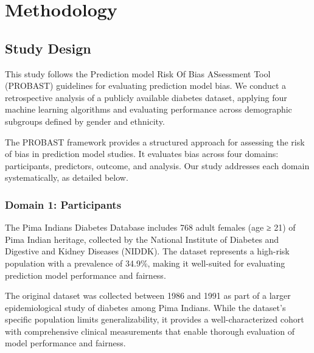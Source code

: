
\section{Methodology}

\subsection{Study Design}

This study follows the Prediction model Risk Of Bias ASsessment Tool 
(PROBAST) guidelines \cite{wolff2019} for evaluating prediction model 
bias. We conduct a retrospective analysis of a publicly available diabetes 
dataset, applying four machine learning algorithms and evaluating 
performance across demographic subgroups defined by gender and ethnicity.

The PROBAST framework provides a structured approach for assessing the 
risk of bias in prediction model studies. It evaluates bias across four 
domains: participants, predictors, outcome, and analysis. Our study 
addresses each domain systematically, as detailed below.

\subsubsection{Domain 1: Participants}

The Pima Indians Diabetes Database includes 768 adult females (age ≥ 21) 
of Pima Indian heritage, collected by the National Institute of Diabetes 
and Digestive and Kidney Diseases (NIDDK). The dataset represents a 
high-risk population with a prevalence of 34.9\%, making it well-suited 
for evaluating prediction model performance and fairness.

The original dataset was collected between 1986 and 1991 as part of a 
larger epidemiological study of diabetes among Pima Indians. While the 
dataset's specific population limits generalizability, it provides a 
well-characterized cohort with comprehensive clinical measurements that 
enable thorough evaluation of model performance and fairness.


